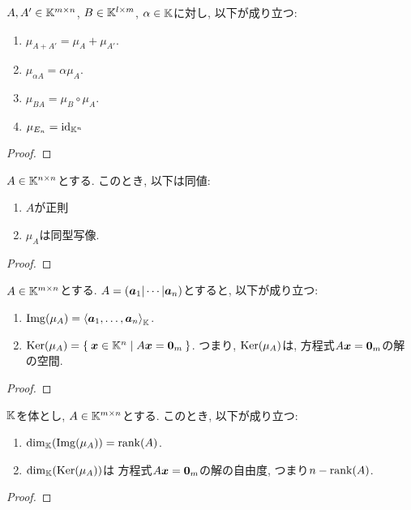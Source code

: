 \begin{prop}
\label{prop:hom:mat:mor}
  $A,A'\in \mathbb{K}^{m\times n}$,
  $B\in\mathbb{K}^{l\times m}$,
  $\alpha \in\mathbb{K}$に対し, 以下が成り立つ:
  \begin{enumerate}
  \item $\mu_{A+A'}=\mu_A+\mu_{A'}$.
  \item $\mu_{\alpha A}=\alpha\mu_A$.
  \item $\mu_{BA}=\mu_B\circ\mu_{A}$.
  \item $\mu_{E_n}=\operatorname{id}_{\mathbb{K}^n}$
  \end{enumerate}
\end{prop}
\begin{proof}\end{proof}

\begin{cor}
  $A\in \mathbb{K}^{n\times n}$とする.
  このとき,
  以下は同値:
  \begin{enumerate}
  \item $A$が正則
  \item $\mu_A$は同型写像.
  \end{enumerate}
\end{cor}
\begin{proof}\end{proof}


\begin{prop}
  $A\in\mathbb{K}^{m\times n}$とする.
  $A=(\boldsymbol{a}_1|\cdots|\boldsymbol{a}_n)$とすると,
  以下が成り立つ:
  \begin{enumerate}
  \item $\operatorname{Img}(\mu_A)=\Braket{\boldsymbol{a}_1,\ldots,\boldsymbol{a}_n}_{\mathbb{K}}$.
  \item $\operatorname{Ker}(\mu_A)=\Set{\boldsymbol{x}\in\mathbb{K}^n|A\boldsymbol{x}=\boldsymbol{0}_m}$. つまり, $\operatorname{Ker}(\mu_A)$は,
    方程式$A\boldsymbol{x}=\boldsymbol{0}_m$の解の空間.
  \end{enumerate}
\end{prop}
\begin{proof}\end{proof}

\begin{cor}
  $\mathbb{K}$を体とし,
  $A\in\mathbb{K}^{m\times n}$とする.
  このとき,
  以下が成り立つ:
  \begin{enumerate}
  \item $\dim_{\mathbb{K}}(\operatorname{Img}(\mu_A))=\operatorname{rank}(A)$.
  \item $\dim_{\mathbb{K}}(\operatorname{Ker}(\mu_A))$は
    方程式$A\boldsymbol{x}=\boldsymbol{0}_m$の解の自由度, つまり$n-\operatorname{rank}(A)$.
  \end{enumerate}
\end{cor}
\begin{proof}\end{proof}

